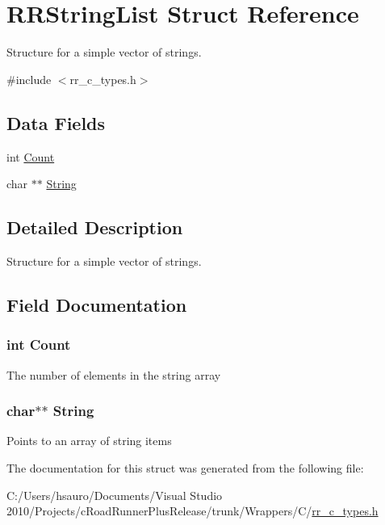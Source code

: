 \hypertarget{struct_r_r_string_list}{
\section{\-R\-R\-String\-List \-Struct \-Reference}
\label{struct_r_r_string_list}
}


\-Structure for a simple vector of strings.  




{\ttfamily \#include $<$rr\-\_\-c\-\_\-types.\-h$>$}

\subsection*{\-Data \-Fields}
\begin{DoxyCompactItemize}
\item 
int \hyperlink{struct_r_r_string_list_aad462966ed963f892117056de1eba502}{\-Count}
\item 
char $\ast$$\ast$ \hyperlink{struct_r_r_string_list_acdbc34377baf3e52d9044aada0f2f511}{\-String}
\end{DoxyCompactItemize}


\subsection{\-Detailed \-Description}
\-Structure for a simple vector of strings. 

\subsection{\-Field \-Documentation}
\hypertarget{struct_r_r_string_list_aad462966ed963f892117056de1eba502}{
\subsubsection[{\-Count}]{\setlength{\rightskip}{0pt plus 5cm}int {\bf \-Count}}}
\label{struct_r_r_string_list_aad462966ed963f892117056de1eba502}
\-The number of elements in the string array \hypertarget{struct_r_r_string_list_acdbc34377baf3e52d9044aada0f2f511}{
\subsubsection[{\-String}]{\setlength{\rightskip}{0pt plus 5cm}char$\ast$$\ast$ {\bf \-String}}}
\label{struct_r_r_string_list_acdbc34377baf3e52d9044aada0f2f511}
\-Points to an array of string items 

\-The documentation for this struct was generated from the following file\-:\begin{DoxyCompactItemize}
\item 
\-C\-:/\-Users/hsauro/\-Documents/\-Visual Studio 2010/\-Projects/c\-Road\-Runner\-Plus\-Release/trunk/\-Wrappers/\-C/\hyperlink{rr__c__types_8h}{rr\-\_\-c\-\_\-types.\-h}\end{DoxyCompactItemize}
